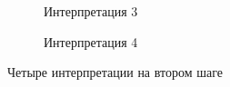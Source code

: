 \documentclass{article}
\begin{document}
\begin{articletext}
\bfullwidth
\begin{figure}
        \centering
        \begin{subfigure}[b]{0.39\textwidth}
                \caption{Интерпретация 3}
        \end{subfigure}
        \quad%
        \begin{subfigure}[b]{0.33\textwidth}
                \caption{Интерпретация 4}
        \end{subfigure}
        \caption{Четыре интерпретации на втором шаге}\label{step2}
\end{figure}
\efullwidth


\end{articletext}
\end{document}
